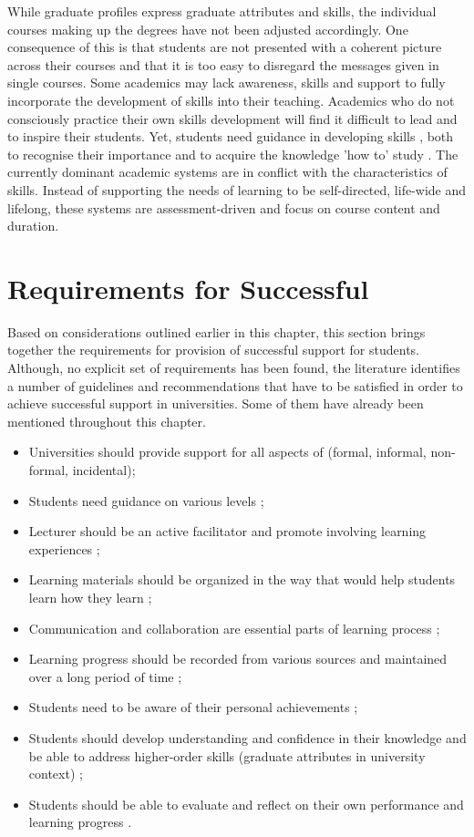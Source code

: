 While graduate profiles express graduate attributes and \LLLs skills, the
individual courses making up the degrees have not been adjusted accordingly. One
consequence of this is that students are not presented with a coherent picture
across their courses and that it is too easy to disregard the messages given in
single courses. Some academics may lack awareness, skills and support to fully
incorporate the development of \LLLs skills into their teaching. Academics who
do not consciously practice their own \LLLs skills development will find it
difficult to lead and to inspire their students. Yet, students need guidance in
developing \LLLs skills \citep{Leone2019}, both to recognise their importance
and to acquire the knowledge 'how to' study \citep{Medel-Anonuevo2001}. The
currently dominant academic systems are in conflict with the characteristics of
\LLLs skills. Instead of supporting the needs of learning to be self-directed,
life-wide and lifelong, these systems are assessment-driven and focus on course
content and duration.

\section{Requirements for Successful \LLLc}
\label{sec:needs}
Based on considerations outlined earlier in this chapter, this section brings
together the requirements for provision of successful \LLLs support for
students. Although, no explicit set of requirements has been found, the
literature identifies a number of guidelines and recommendations that have to be
satisfied in order to achieve successful \LLLs support in universities. Some of
them have already been mentioned throughout this chapter.
 
\begin{itemize}
  \item Universities should provide support for all aspects of \LLLs (formal,
  informal, non-formal, incidental); 
  \item Students need guidance on various levels \citep{Leone2019};
  \item Lecturer should be an active facilitator and promote involving learning
experiences \citep{Leone2019}; 
  \item Learning materials should be organized in the way that would help
students learn how they learn \citep{Medel-Anonuevo2001};
  \item Communication and collaboration are essential parts of learning process
  \citep{Schaffert2008};
  \item Learning progress should be recorded from various sources and maintained
  over a long period of time \citep{Kay2008};
  \item Students need to be aware of their personal achievements
\citep{Schuetze2006};
  \item Students should develop understanding and confidence in their knowledge
  and be able to address higher-order skills (graduate attributes in university
  context) \citep{Hart1999};
  \item Students should be able to evaluate and reflect on their own performance
and learning progress \citep{Mourtos2003}.
\end{itemize} 

